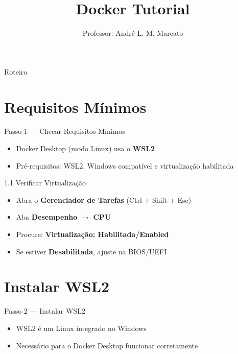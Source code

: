 \title[Docker Tutorial]{Docker Tutorial}
\author[Marcato]{Professor: André L. M. Marcato}
\date{}

\begin{frame}
  \titlepage
\end{frame}

\begin{frame}{Roteiro}
\tableofcontents
\end{frame}

\section{Requisitos Mínimos}

\begin{frame}{Passo 1 — Checar Requisitos Mínimos}
\begin{itemize}
  \item Docker Desktop (modo Linux) usa o \textbf{WSL2}
  \item Pré-requisitos: WSL2, Windows compatível e virtualização habilitada
\end{itemize}
\end{frame}

\begin{frame}{1.1 Verificar Virtualização}
\begin{itemize}
  \item Abra o \textbf{Gerenciador de Tarefas} (Ctrl + Shift + Esc)
  \item Aba \textbf{Desempenho} $\rightarrow$ \textbf{CPU}
  \item Procure: \textbf{Virtualização: Habilitada/Enabled}
  \item Se estiver \textbf{Desabilitada}, ajuste na BIOS/UEFI
\end{itemize}
\end{frame}

\section{Instalar WSL2}

\begin{frame}{Passo 2 — Instalar WSL2}
\begin{itemize}
  \item WSL2 é um Linux integrado no Windows
  \item Necessário para o Docker Desktop funcionar corretamente
\end{itemize}
\end{frame}

